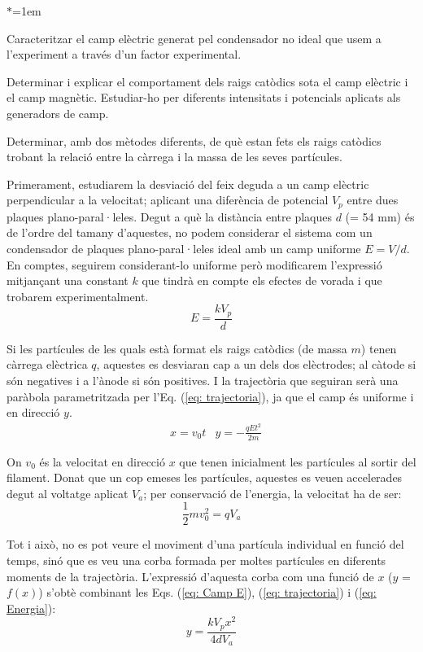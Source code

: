 \documentclass[11pt]{article}
\numberwithin{equation}{section}
\numberwithin{figure}{section}
\numberwithin{table}{section}
\begin{document}
\begin{list}{$\ast$}{\leftmargin=1em}
    \item Caracteritzar el camp elèctric generat pel condensador no ideal que usem a l'experiment a través d'un factor experimental.
    \item Determinar i explicar el comportament dels raigs catòdics sota el camp elèctric i el camp magnètic. Estudiar-ho per diferents intensitats i potencials aplicats als generadors de camp.
    \item Determinar, amb dos mètodes diferents, de què estan fets els raigs catòdics trobant la relació entre la càrrega i la massa de les seves partícules.
\end{list}


Primerament, estudiarem la desviació del feix deguda a un camp elèctric perpendicular a la velocitat; aplicant una diferència de potencial $V_p$ entre dues plaques plano-paral·leles. Degut a què la distància entre plaques $d$ (= 54 mm) és de l'ordre del tamany d'aquestes, no podem considerar el sistema com un condensador de plaques plano-paral·leles ideal amb un camp uniforme $E=V/d$. En comptes, seguirem considerant-lo uniforme però modificarem l'expressió mitjançant una constant $k$ que tindrà en compte els efectes de vorada i que trobarem experimentalment.
\begin{equation}
    E = \frac{kV_p}{d}
    \label{eq: Camp E}
\end{equation}

Si les partícules de les quals està format els raigs catòdics (de massa $m$) tenen càrrega elèctrica $q$, aquestes es desviaran cap a un dels dos elèctrodes; al càtode si són negatives i a l'ànode si són positives. I la trajectòria que seguiran serà una paràbola parametritzada per l'Eq. (\ref{eq: trajectoria}), ja que el camp és uniforme i en direcció $y$.
\begin{align}    \label{eq: trajectoria}
    &x = v_0 t      &y = -\frac{qEt^2}{2m}
\end{align}

On $v_0$ és la velocitat en direcció $x$ que tenen inicialment les partícules al sortir del filament.
Donat que un cop emeses les partícules, aquestes es veuen accelerades degut al voltatge aplicat $V_a$; per conservació de l'energia, la velocitat ha de ser:
\begin{equation}
    \frac{1}{2}mv_0^2=qV_a
    \label{eq: Energia}
\end{equation}

Tot i això, no es pot veure el moviment d'una partícula individual en funció del temps, sinó que es veu una corba formada per moltes partícules en diferents moments de la trajectòria. L'expressió d'aquesta corba com una funció de $x$ ($y$ = $f(x)$)  s'obtè combinant les Eqs. (\ref{eq: Camp E}), (\ref{eq: trajectoria}) i (\ref{eq: Energia}):
\begin{equation}
    y = \frac{kV_px^2}{4dV_a}
    \label{eq: parabola}
\end{equation}
\end{document}

